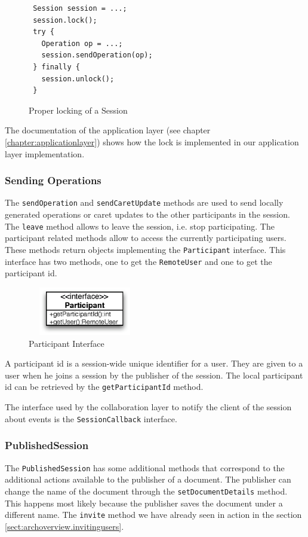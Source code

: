 \begin{figure}[H]
 \centering
 \small{\begin{verbatim}
 Session session = ...;
 session.lock();
 try {
   Operation op = ...;
   session.sendOperation(op);
 } finally {
   session.unlock();
 }
 \end{verbatim}}
 \caption{Proper locking of a Session}
\end{figure}

The documentation of the application layer (see chapter 
\ref{chapter:applicationlayer}) 
shows how the lock is implemented in our application layer implementation.


\subsubsection{Sending Operations}
The \texttt{sendOperation} and \texttt{sendCaretUpdate} methods are used to send 
locally generated operations or
caret updates to the other participants in the session. The \texttt{leave}
method allows to leave the session, i.e. stop participating. The participant
related methods allow to access the currently participating users. These
methods return objects implementing the \texttt{Participant} interface. This
interface has
two methods, one to get the \texttt{RemoteUser} and one to get the participant
id.

\begin{figure}[H]
 \centering
 \includegraphics[width=4.97cm,height=2.1cm]{../images/finalreport/architecture_participant_uml.eps}
 \caption{Participant Interface}
\end{figure}

A participant id is a session-wide unique identifier for a user. They are given
to a user when he joins a session by the publisher of the session. The local
participant id can be retrieved by the \texttt{getParticipantId} method.

The interface used by the collaboration layer to notify the client of the
session about events is the \texttt{SessionCallback} interface.


\subsubsection{PublishedSession}
The \texttt{PublishedSession} has some additional methods that correspond
to the additional actions available to the publisher of a document. The
publisher can change the name of the document through the
\texttt{setDocumentDetails} method. This happens most likely because the
publisher saves the document under a different name.
The \texttt{invite} method we have already seen in action in the section
\ref{sect:archoverview.invitingusers}.


